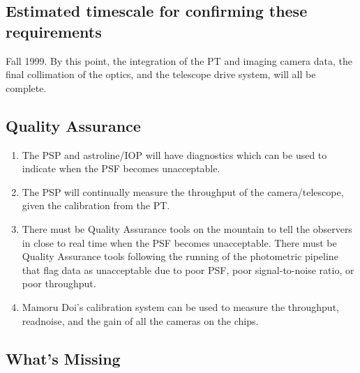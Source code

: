 \subsection{Estimated timescale for confirming these requirements}
Fall 1999.  By this point, the integration of the PT
and imaging camera data, the final collimation of the optics, and the
telescope drive system, will all be complete. 


\subsection{Quality Assurance}
\begin{enumerate}
\item The PSP and astroline/IOP will have diagnostics which can be
used to indicate when the PSF becomes unacceptable. 
\item The PSP will continually measure the throughput of the
camera/telescope, given the calibration from the PT.
\item There must be Quality Assurance tools on the mountain to tell
the observers in close to real time when the PSF becomes
unacceptable.  There must be Quality Assurance tools following the
running of the photometric pipeline that flag data as unacceptable due
to poor PSF, poor signal-to-noise ratio, or poor throughput. 
\item Mamoru Doi's calibration system can be used to measure the
throughput, readnoise, and the gain of all the cameras on the chips. 
\end{enumerate}



\subsection{What's Missing}

